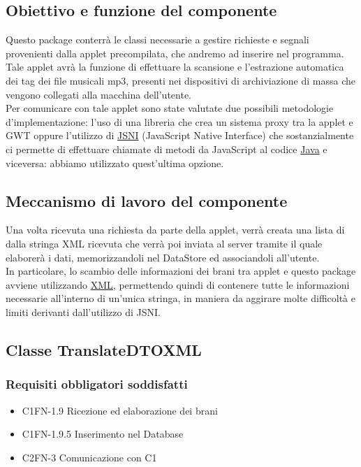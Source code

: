 \subsection*{Obiettivo e funzione del componente}
Questo package conterr\`a le classi necessarie a gestire richieste e segnali
provenienti dalla applet precompilata, che andremo ad inserire nel programma.
Tale applet avr\`a la funzione di effettuare la scansione e l'estrazione
automatica dei tag dei file musicali mp3, presenti nei dispositivi di
archiviazione di massa che vengono collegati alla macchina dell'utente.\\
Per comunicare con tale applet sono state valutate due possibili metodologie
d'implementazione: l'uso di una libreria che crea un sistema proxy tra la applet
e GWT oppure l'utilizzo di \underline{JSNI} (JavaScript Native Interface) che
sostanzialmente ci permette di effettuare chiamate di metodi da JavaScript al
codice \underline{Java} e viceversa: abbiamo utilizzato quest'ultima opzione.
\subsection*{Meccanismo di lavoro del componente}
Una volta ricevuta una richiesta da parte della applet, verr\`a creata
una lista di  dalla stringa XML ricevuta che verr\`a poi inviata al
server tramite  il quale elaborer\`a i dati, memorizzandoli
nel DataStore ed associandoli all'utente.\\
In particolare, lo scambio delle informazioni dei brani tra applet e questo
package avviene utilizzando \underline{XML}, permettendo quindi di contenere
tutte le informazioni necessarie all'interno di un'unica stringa, in maniera da
aggirare molte difficolt\`a e limiti derivanti dall'utilizzo di JSNI.

\subsection{Classe TranslateDTOXML}
\subsubsection*{Requisiti obbligatori soddisfatti}
\begin{itemize}
    \item C1FN-1.9 Ricezione ed elaborazione dei brani
    \item C1FN-1.9.5 Inserimento nel Database
    \item C2FN-3 Comunicazione con C1
\end{itemize}
